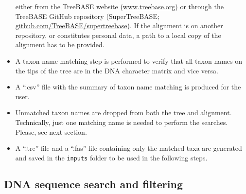 \documentclass[]{article}
\begin{document}
\begin{itemize}
  either from the TreeBASE website (\href{https://treebase.org/}{www.treebase.org})
  or through the TreeBASE GitHub repository (SuperTreeBASE; \href{https://github.com/TreeBASE/supertreebase}{github.com/TreeBASE/supertreebase}).
  If the alignment is on another repository, or constitutes personal data, a path to a local copy of the alignment has to be provided.
\item
  A taxon name matching step is performed to verify that all taxon names on the tips
  of the tree are in the DNA character matrix and vice versa.
\item
  A ``.csv'' file with the summary of taxon name matching is produced for the user.
\item
  Unmatched taxon names are dropped from both the tree and alignment.
  Technically, just one matching name is needed to perform the searches. Please, see next section.
\item
  A ``.tre'' file and a ``.fas'' file containing only the matched taxa are generated and saved in the \texttt{inputs} folder to be used in the following steps.
\end{itemize}

\hypertarget{dna-sequence-search-and-filtering}{%
\subsection{DNA sequence search and filtering}\label{dna-sequence-search-and-filtering}}
\end{document}
